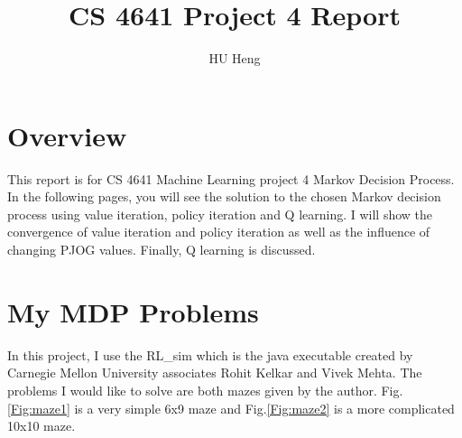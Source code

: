 \documentclass[11pt]{article}
\title{CS 4641 Project 4 Report}
\author{HU Heng}
\begin{document}
\maketitle
\section{Overview}
This report is for CS 4641 Machine Learning project 4 Markov Decision Process. In the following pages, you will see the solution to the chosen Markov decision process using value iteration, policy iteration and Q learning. I will show the convergence of value iteration and policy iteration as well as the influence of changing PJOG values. Finally, Q learning is discussed.

\section{My MDP Problems}
In this project, I use the RL\_sim which is the java executable created by Carnegie Mellon University associates Rohit Kelkar and Vivek Mehta. The problems I would like to solve are both mazes given by the author. Fig.\ref{Fig:maze1} is a very simple 6x9 maze and Fig.\ref{Fig:maze2} is a more complicated 10x10 maze.
\end{document}
